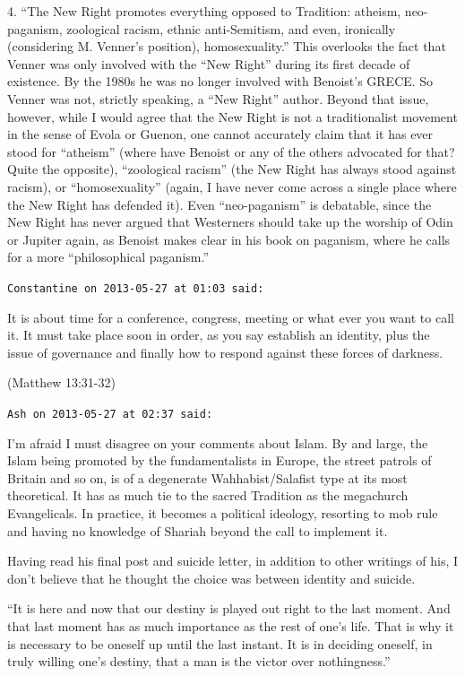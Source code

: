 \begin{footnotesize}
\begin{sffamily}
4. ``The New Right promotes everything opposed to Tradition: atheism, neo-paganism, zoological racism, ethnic anti-Semitism, and even, ironically (considering M. Venner's position), homosexuality.'' This overlooks the fact that Venner was only involved with the ``New Right'' during its first decade of existence. By the 1980s he was no longer involved with Benoist's GRECE. So Venner was not, strictly speaking, a ``New Right'' author. Beyond that issue, however, while I would agree that the New Right is not a traditionalist movement in the sense of Evola or Guenon, one cannot accurately claim that it has ever stood for ``atheism'' (where have Benoist or any of the others advocated for that? Quite the opposite), ``zoological racism'' (the New Right has always stood against racism), or ``homosexuality'' (again, I have never come across a single place where the New Right has defended it). Even ``neo-paganism'' is debatable, since the New Right has never argued that Westerners should take up the worship of Odin or Jupiter again, as Benoist makes clear in his book on paganism, where he calls for a more ``philosophical paganism.''

\hfill

\texttt{Constantine on 2013-05-27 at 01:03 said:}

It is about time for a conference, congress, meeting or what ever you want to call it. It must take place soon in order, as you say establish an identity, plus the issue of governance and finally how to respond against these forces of darkness.

(Matthew 13:31-32)

\hfill

\texttt{Ash on 2013-05-27 at 02:37 said:}

I'm afraid I must disagree on your comments about Islam. By and large, the Islam being promoted by the fundamentalists in Europe, the street patrols of Britain and so on, is of a degenerate Wahhabist/Salafist type at its most theoretical. It has as much tie to the sacred Tradition as the megachurch Evangelicals. In practice, it becomes a political ideology, resorting to mob rule and having no knowledge of Shariah beyond the call to implement it.

Having read his final post and suicide letter, in addition to other writings of his, I don't believe that he thought the choice was between identity and suicide.

``It is here and now that our destiny is played out right to the last moment. And that last moment has as much importance as the rest of one's life. That is why it is necessary to be oneself up until the last instant. It is in deciding oneself, in truly willing one's destiny, that a man is the victor over nothingness.''


\end{sffamily}
\end{footnotesize}
